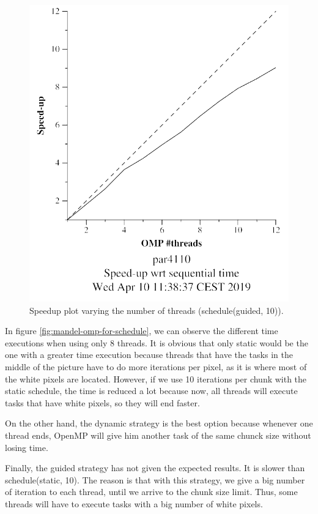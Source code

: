\documentclass[12pt, a4paper]{article}
\begin{document}
\begin{figure}[H]
\begin{minipage}[b]{0.4\linewidth}
  \includegraphics[scale=0.5]{./mandel-omp-10000-strong-omp-for-guided-800-speedup}
  \caption{Speedup plot varying the number of threads (schedule(guided, 10)).}
  \label{fig:mandel-omp-10000-strong-omp-for-guided-800-speedup}
\end{minipage}
\end{figure}

In figure \ref{fig:mandel-omp-for-schedule}, we can observe the different time executions when using only 8 threads. It is obvious that only static would be the one with a greater time execution because threads that have the tasks in the middle of the picture  have to do more iterations per pixel, as it is where most of the white pixels are located. However, if we use 10 iterations per chunk with the static schedule, the time is reduced a lot because now, all threads will execute tasks that have white pixels, so they will end faster.

On the other hand, the dynamic strategy is the best option because whenever one thread ends, OpenMP will give him another task of the same chunck size without losing time.

Finally, the guided strategy has not given the expected results. It is slower than schedule(static, 10). The reason is that with this strategy, we give a big number of iteration to each thread, until we arrive to the chunk size limit. Thus, some threads will have to execute tasks with a big number of white pixels.
\end{document}

